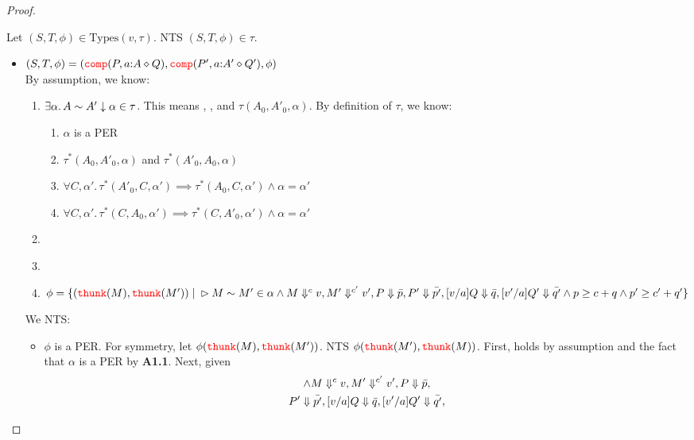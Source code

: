 \begin{proof}
\begin{enumerate}
Let $(S,T,\phi) \in \text{Types}(v,\tau)$. NTS $(S,T,\phi) \in \tau$.
\begin{itemize}
  \item $(S,T,\phi) = ({\color{red}{\mathtt{comp}}}(P, a {:} A \diamond Q), {\color{red}{\mathtt{comp}}}(P', a {:} A' \diamond Q'), \phi)$\\
  By assumption, we know:
    \begin{enumerate}[label=\textbf{\Alph*)}]
     \item $\exists \alpha.\, A \sim A' \downarrow \alpha \in \tau$. This means 
  , , and $\tau(A_0,A'_0,\alpha)$. By definition of $\tau$, we know: 
  \begin{enumerate}[label=\textbf{A1.\arabic*}]
    \item $\alpha$ is a PER 
    \item $\tau^*(A_0,A'_0,\alpha)$ and $\tau^*(A'_0,A_0,\alpha)$ \label{fact:alphaper}
    \item $\forall C,\alpha'.\, \tau^*(A'_0,C,\alpha') \implies \tau^*(A_0,C,\alpha') \land \alpha = \alpha'$ \label{fact:propA}
    \item $\forall C,\alpha'.\, \tau^*(C,A_0,\alpha') \implies \tau^*(C,A'_0,\alpha') \land \alpha = \alpha'$
   \end{enumerate}
     \item {} \label{fact:peq}
     \item {} \label{fact:qeq}
     \item $\phi = \{({\color{red}{\mathtt{thunk}}}(M), {\color{red}{\mathtt{thunk}}}(M')) \mid \\
   \rhd M \sim M' \in \alpha\\
  \land M \Downarrow^{c} v, M' \Downarrow^{c'} v', P \Downarrow \bar{p},  
    P' \Downarrow \bar{p'}, [v/a]Q \Downarrow \bar{q}, [v'/a]Q' \Downarrow \bar{q'}\\
  \land p \ge c + q \land p' \ge c' + q'\\
  \}$
    \end{enumerate}
    We NTS:
    \begin{itemize}
      \item $\phi$ is a PER. For symmetry, let $\phi({\color{red}{\mathtt{thunk}}}(M), {\color{red}{\mathtt{thunk}}}(M'))$. 
        NTS $\phi({\color{red}{\mathtt{thunk}}}(M'), {\color{red}{\mathtt{thunk}}}(M))$. 
        First,  holds by assumption and the fact that 
        $\alpha$ is a PER by \textbf{A1.1}. Next, given 
        \begin{gather*}
          \land \evalCost{M}{c}{v}, \evalCost{M'}{c'}{v'}, \eval{P}{\bar{p}},\\
          \eval{P'}{\bar{p'}}, \eval{[v/a]Q}{\bar{q}}, \eval{[v'/a]Q'}{\bar{q'}},\\

\end{gather*}
\end{itemize}
\end{itemize}
\end{enumerate}
\end{proof}
